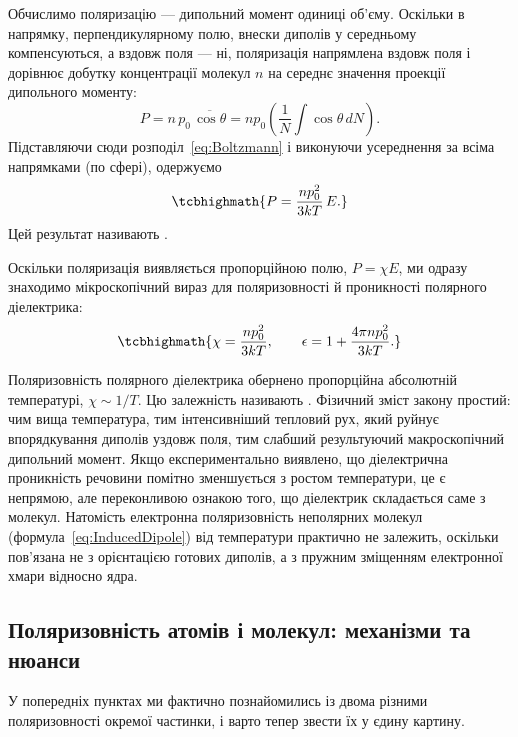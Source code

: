 Обчислимо поляризацію --- дипольний момент одиниці об'єму. Оскільки в напрямку, перпендикулярному полю, внески диполів у середньому компенсуються, а
вздовж поля --- ні, поляризація напрямлена вздовж поля і дорівнює добутку концентрації молекул $n$ на середнє значення проекції дипольного моменту:
\begin{equation*}
	P = n\, p_0\, \overline{\cos\theta} = n p_0 \left(\frac1N \int \cos\theta\, dN\right).
\end{equation*}
Підставляючи сюди розподіл~\eqref{eq:Boltzmann} і виконуючи усереднення за всіма напрямками (по сфері), одержуємо
\begin{equation}\label{eq:LangevinDebye}
	\tcbhighmath{
		P = \frac{n p_0^2}{3kT}\, E.
	}
\end{equation}
Цей результат називають .

Оскільки поляризація виявляється пропорційною полю, $P = \chi E$, ми одразу знаходимо мікроскопічний вираз для поляризовності й проникності
полярного діелектрика:
\begin{equation}\label{eq:CurieLaw}
	\tcbhighmath{
		\chi = \frac{n p_0^2}{3kT}, \qquad \epsilon = 1 + \frac{4\pi n p_0^2}{3kT}.
	}
\end{equation}

\begin{Attention}
	Поляризовність полярного діелектрика обернено пропорційна абсолютній температурі, $\chi \sim 1/T$. Цю залежність називають . Фізичний зміст закону простий: чим вища температура, тим інтенсивніший тепловий рух, який руйнує впорядкування диполів уздовж поля,
	тим слабший результуючий макроскопічний дипольний момент. Якщо експериментально виявлено, що діелектрична проникність речовини помітно
	зменшується з ростом температури, це є непрямою, але переконливою ознакою того, що діелектрик складається саме з  молекул.
	Натомість електронна поляризовність неполярних молекул (формула~\eqref{eq:InducedDipole}) від температури практично не залежить, оскільки
	пов'язана не з орієнтацією готових диполів, а з пружним зміщенням електронної хмари відносно ядра.
\end{Attention}

\subsection*{Поляризовність атомів і молекул: механізми та нюанси}\label{sec:AtomPolarizability}

У попередніх пунктах ми фактично познайомились із двома різними  поляризовності окремої частинки, і варто тепер звести їх у
єдину картину.


